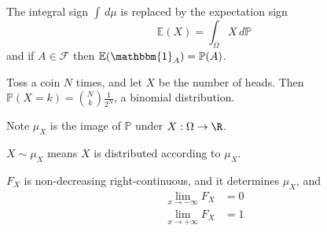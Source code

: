 \documentclass{article}
\newcommand{\1}[1]{\mathbbm{1}_{#1}}
\newcommand{\Prob}{\mathbb{P}}
\newcommand{\E}{\mathbb{E}}
\begin{document}

\begin{notation}
    The integral sign $\int \, d\mu$ is replaced by the expectation sign
    \begin{equation*}
        \mathbb{E}(X) = \int_\Omega X \, d \Prob
    \end{equation*}
    and if $A \in \mathcal{F}$ then $\E(\1{A}) = \Prob(A)$.
\end{notation}

\begin{eg}
    Toss a coin $N$ times, and let $X$ be the number of heads. Then $\Prob(X = k) = \binom{N}{k} \frac{1}{2^N}$, a binomial distribution.
\end{eg}

Note $\mu_X$ is the image of $\Prob$ under $X: \Omega \to \R$.

\begin{notation}
    $X \sim \mu_X$ means $X$ is distributed according to $\mu_X$.
\end{notation}

\begin{defi}[Cumulative probability function]\hypertarget{def:cdf}
    The function $F_X = \Prob(X \leq x) = \mu_X(-\infty, x]$ is the \textbf{cumulative probability function}.
\end{defi}

\begin{remark}
    $F_X$ is non-decreasing right-continuous, and it determines $\mu_X$, and
    \begin{equation*} \tag{$*$} \label{eq:cumLimits}
        \begin{aligned}
            \lim_{x \to -\infty} F_X &= 0 \\
            \lim_{x \to +\infty} F_X &= 1
        \end{aligned}
    \end{equation*}
\end{remark}
\end{document}
